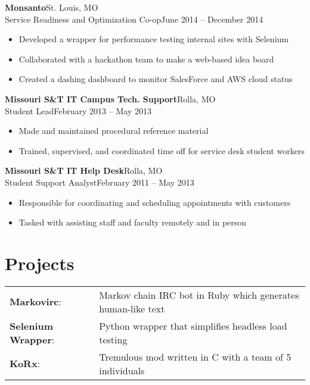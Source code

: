 \documentclass[margin]{res}
\newcommand{\github}[0]%
{%
  \hspace{-4mm}\faGithubSign\hspace{1mm}%
}
\begin{document}
\begin{resume}
       \textbf{Monsanto}\hfill St. Louis, MO\\
       Service Readiness and Optimization Co-op\hfill June 2014 -- December 2014
       \begin{itemize} \itemsep -1pt  %
         \item Developed a wrapper for performance testing internal sites with Selenium
         \item Collaborated with a hackathon team to make a web-based idea board 
         \item Created a dashing dashboard to monitor SalesForce and AWS cloud status
       \end{itemize}

       \textbf{Missouri S\&T IT Campus Tech. Support}\hfill  Rolla, MO\\
       Student Lead\hfill February 2013 -- May 2013
       \begin{itemize} \itemsep -1pt  %
         \item Made and maintained procedural reference material
         \item Trained, supervised, and coordinated time off for service desk student workers
       \end{itemize}
     
       \textbf{Missouri S\&T IT Help Desk}\hfill Rolla, MO\\
       Student Support Analyst\hfill February 2011 -- May 2013
       \begin{itemize} \itemsep -1pt  %
         \item Responsible for coordinating and scheduling appointments with customers
         \item Tasked with assisting staff and faculty remotely and in person
       \end{itemize}

    \section{Projects} 
      \begin{tabular}{l p{4in}}
        \github\textbf{Markovirc}:            & Markov chain IRC bot in Ruby which generates human-like text \\ [1pt]
        \github\textbf{Selenium Wrapper}:     & Python wrapper that simplifies headless load testing \\ [1pt]
        \textbf{KoRx}:                        & Tremulous mod written in C with a team of 5 individuals \\ [1pt]
      \end{tabular}


\end{resume}
\end{document}
